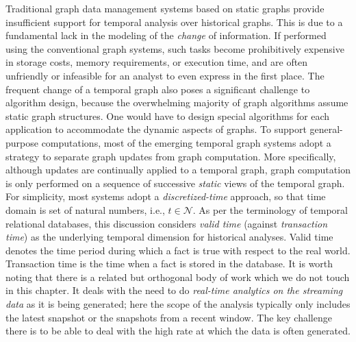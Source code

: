 \documentclass[graybox, natbib, nosecnum, twocolumn]{svmult}
\begin{document}
Traditional graph data management systems based on static graphs provide insufficient support for temporal analysis over historical graphs.   
This is due to a fundamental lack in the modeling of the {\em change} of information. 
If performed using the conventional graph systems, such tasks become prohibitively expensive in storage costs, memory requirements, or execution time, and are often unfriendly or infeasible for an analyst to even express in the first place. 
The frequent change of a temporal graph also poses a significant challenge to algorithm design, because the overwhelming majority of graph algorithms assume static graph structures. One would have to design special algorithms for each application to accommodate the dynamic aspects of graphs. To support general-purpose computations, most of the emerging temporal graph systems adopt a strategy to separate graph updates from graph computation. More specifically, although updates are continually applied to a temporal graph, graph computation is only performed on a sequence of successive \emph{static} views of the temporal graph. For simplicity, most systems adopt a \emph{discretized-time} approach, so that time domain is set of natural numbers, i.e., $t\in \mathcal{N}$. 
As per the terminology of temporal relational databases, this discussion considers {\em valid time} (against {\em transaction time}) as the underlying temporal dimension for historical analyses. Valid time denotes the time
period during which a fact is true with respect to the real world. Transaction time is the time
when a fact is stored in the database. 
It is worth noting that there is a related but orthogonal body of work which we do not touch in this chapter. It deals with the need to do {\em real-time analytics on the streaming data} as it is being generated; here the scope of the analysis typically only includes the latest snapshot or the snapshots from a recent window. The key challenge there is to be able to deal with the high rate at which the data is often generated.
\end{document}
